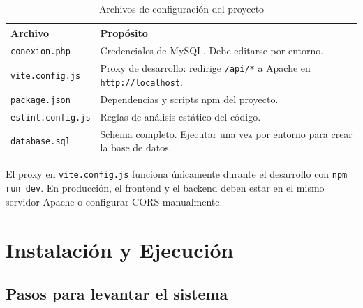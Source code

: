 \documentclass[10pt,letterpaper]{report}
\begin{document}
\begin{table}[H]
\centering
\caption{Archivos de configuración del proyecto}
\label{tab:config}
\begin{tabular}{p{} p{}}
\toprule
\textbf{Archivo} & \textbf{Propósito} \\
\midrule
\texttt{conexion.php} & Credenciales de MySQL. Debe editarse por entorno. \\
\texttt{vite.config.js} & Proxy de desarrollo: redirige \texttt{/api/*} a Apache en \texttt{http://localhost}. \\
\texttt{package.json} & Dependencias y scripts npm del proyecto. \\
\texttt{eslint.config.js} & Reglas de análisis estático del código. \\
\texttt{database.sql} & Schema completo. Ejecutar una vez por entorno para crear la base de datos. \\
\bottomrule
\end{tabular}
\end{table}

El proxy en \texttt{vite.config.js} funciona únicamente durante el desarrollo con \texttt{npm run dev}. En producción, el frontend y el backend deben estar en el mismo servidor Apache o configurar CORS manualmente.

\chapter{Instalación y Ejecución}

\section{Pasos para levantar el sistema}
\end{document}
